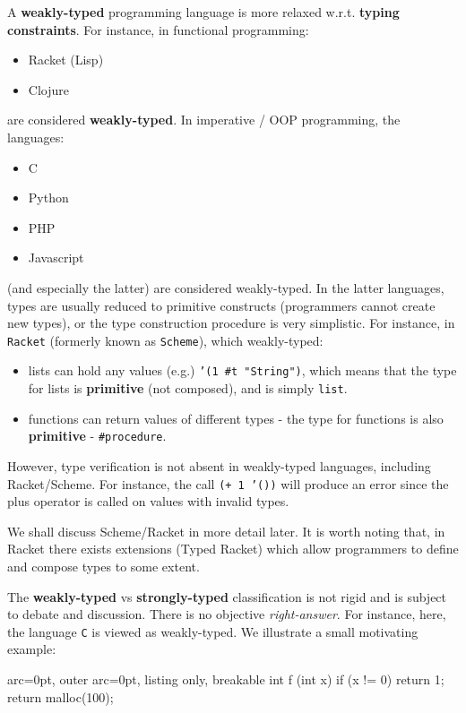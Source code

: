 A \textbf{weakly-typed} programming language is more relaxed w.r.t. \textbf{typing constraints}. For instance, in functional programming:
\begin{itemize}
	\item  Racket (Lisp)
	\item  Clojure
\end{itemize}
are considered \textbf{weakly-typed}. In imperative / OOP programming, the languages:
\begin{itemize}
	\item  C
	\item  Python
	\item  PHP
	\item  Javascript
\end{itemize}

(and especially the latter) are considered weakly-typed. In the latter languages, types are usually reduced to primitive constructs (programmers cannot create new types), or the type construction procedure is very simplistic. For instance, in \texttt{Racket} (formerly known as \texttt{Scheme}), which weakly-typed:
\begin{itemize}
	\item  lists can hold any values (e.g.) \texttt{'(1 \#t "String")}, which means that the type for lists is \textbf{primitive} (not composed), and is simply \texttt{list}.
	\item  functions can return values of different types - the type for functions is also \textbf{primitive} - \texttt{\#procedure}. 
\end{itemize}

However, type verification is not absent in weakly-typed languages, including Racket/Scheme. For instance, the call \texttt{(+ 1 '())} will produce an error since the plus operator is called on values with invalid types.

We shall discuss Scheme/Racket in more detail later. It is worth noting that, in Racket there exists extensions (Typed Racket) which allow programmers to define and compose types to some extent.

The \textbf{weakly-typed} vs \textbf{strongly-typed} classification is not rigid and is subject to debate and discussion. There is no objective \textit{right-answer}. For instance, here, the language \texttt{C} is viewed as weakly-typed. We illustrate a small motivating example:


\begin{tcblisting}{ arc=0pt, outer arc=0pt, listing only, breakable}
int f (int x) {
    if (x != 0)
        return 1;
    return malloc(100);
}

\end{tcblisting}


